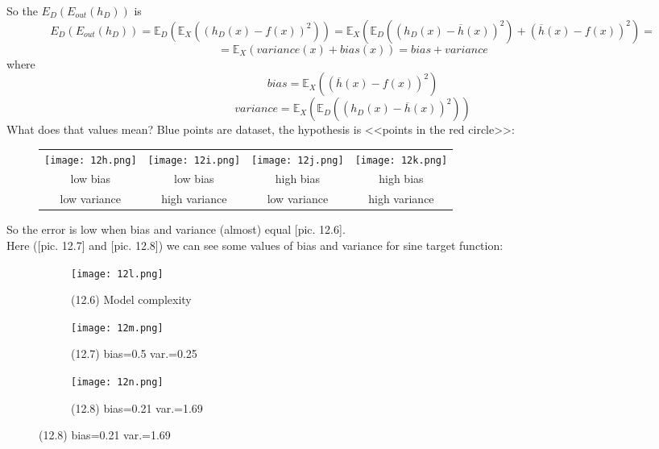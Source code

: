 So the $E_D\left(E_{out}(h_D)\right)$ is
$$E_D\left(E_{out}(h_D)\right)=\mathbb{E}_D\left(\mathbb{E}_X\left(\left(h_D(x)-f(x)\right)^2\right)\right)=\mathbb{E}_X\left(\mathbb{E}_D\left(\left(h_D(x)-\overline{h}(x)\right)^2\right)+\left(\overline{h}(x)-f(x)\right)^2\right)=$$
$$=\mathbb{E}_X(variance(x)+bias(x))=bias+variance$$
where
$$bias=\mathbb{E}_X\left(\left(\overline{h}(x)-f(x)\right)^2\right)$$
$$variance=\mathbb{E}_X\left(\mathbb{E}_D\left(\left(h_D(x)-\overline{h}(x)\right)^2\right)\right)$$
What does that values mean? Blue points are dataset, the hypothesis is <<points in the red circle>>:
\begin{figure}[H]
  \centering
  \begin{tabular}{cccc}
    \texttt{[image: 12h.png]} & \hspace{0.25cm}
    \texttt{[image: 12i.png]} & \hspace{0.25cm}
    \texttt{[image: 12j.png]} & \hspace{0.25cm}
    \texttt{[image: 12k.png]} \\
    low bias & low bias & high bias & high bias \\
    low variance & high variance & low variance & high variance \\
  \end{tabular}
\end{figure}
So the error is low when bias and variance (almost) equal [pic. 12.6].\\
Here ([pic. 12.7] and [pic. 12.8]) we can see some values of bias and variance for sine target function:
\begin{figure}[H]
  \centering
  \begin{subfigure}[c]{0.36\linewidth}
    \texttt{[image: 12l.png]}
    \caption*{(12.6) Model complexity}
  \end{subfigure}
  \hspace{0.4cm}
  \begin{subfigure}[c]{0.28\linewidth}
    \texttt{[image: 12m.png]}
    \caption*{(12.7) bias=0.5 var.=0.25}
  \end{subfigure}
  \hspace{0.4cm}
  \begin{subfigure}[c]{0.28\linewidth}
    \texttt{[image: 12n.png]}
    \caption*{(12.8) bias=0.21 var.=1.69}
  \end{subfigure}
\end{figure}


